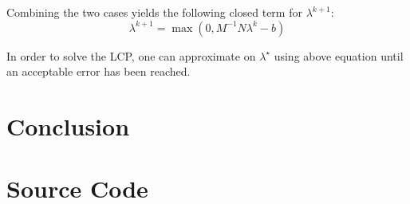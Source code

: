 \documentclass[10pt,oneside,a4paper,final,english]{memoir}
\begin{document}
Combining the two cases yields the following closed term for
$\lambda^{k+1}$:
\[ \lambda^{k+1} = \max(0, M^{-1}N\lambda^k - b) \]

In order to solve the LCP, one can approximate on $\lambda^\star$
using above equation until an acceptable error has been reached.


\section{Conclusion}


\appendix
\section{Source Code}
\end{document}
